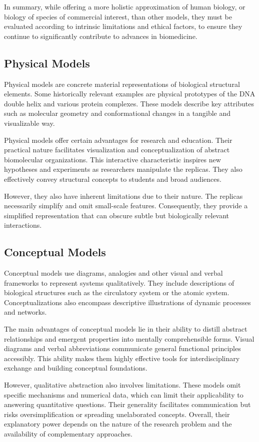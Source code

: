 In summary, while offering a more holistic approximation of human biology, or biology of species of commercial interest, than other models, they must be evaluated according to intrinsic limitations and ethical factors, to ensure they continue to significantly contribute to advances in biomedicine.

\subsection{Physical Models}
Physical models are concrete material representations of biological structural elements. Some historically relevant examples are physical prototypes of the DNA double helix and various protein complexes. These models describe key attributes such as molecular geometry and conformational changes in a tangible and visualizable way.

Physical models offer certain advantages for research and education. Their practical nature facilitates visualization and conceptualization of abstract biomolecular organizations. This interactive characteristic inspires new hypotheses and experiments as researchers manipulate the replicas. They also effectively convey structural concepts to students and broad audiences.

However, they also have inherent limitations due to their nature. The replicas necessarily simplify and omit small-scale features. Consequently, they provide a simplified representation that can obscure subtle but biologically relevant interactions.

\subsection{Conceptual Models}
Conceptual models use diagrams, analogies and other visual and verbal frameworks to represent systems qualitatively. They include descriptions of biological structures such as the circulatory system or the atomic system. Conceptualizations also encompass descriptive illustrations of dynamic processes and networks.

The main advantages of conceptual models lie in their ability to distill abstract relationships and emergent properties into mentally comprehensible forms. Visual diagrams and verbal abbreviations communicate general functional principles accessibly. This ability makes them highly effective tools for interdisciplinary exchange and building conceptual foundations.

However, qualitative abstraction also involves limitations. These models omit specific mechanisms and numerical data, which can limit their applicability to answering quantitative questions. Their generality facilitates communication but risks oversimplification or spreading unelaborated concepts. Overall, their explanatory power depends on the nature of the research problem and the availability of complementary approaches.

